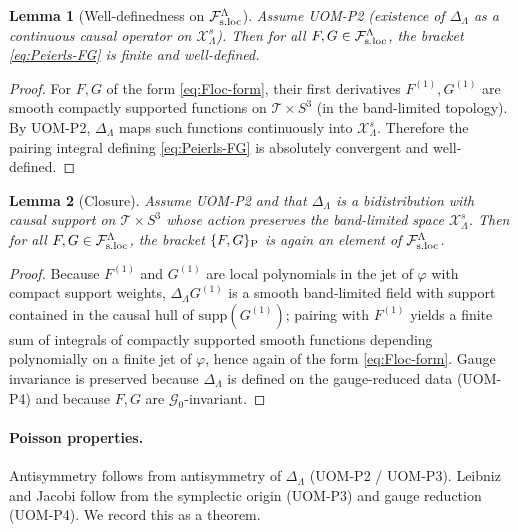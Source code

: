 \documentclass[10pt]{article}
\theoremstyle{definition}
\theoremstyle{plain}
\newtheorem{lemma}{Lemma}[section]
\begin{document}
\begin{lemma}[Well-definedness on $\mathcal F_{\rm s.loc}^\Lambda$]
\label{lem:Peierls-well-defined}
Assume UOM-P2 (existence of $\Delta_\Lambda$ as a continuous causal operator on $\mathcal X_\Lambda^s$).
Then for all $F,G\in\mathcal F_{\rm s.loc}^\Lambda$, the bracket \eqref{eq:Peierls-FG} is finite and well-defined.
\end{lemma}

\begin{proof}
For $F,G$ of the form \eqref{eq:Floc-form}, their first derivatives $F^{(1)},G^{(1)}$ are smooth compactly supported functions on
$\mathscr T\times S^3$ (in the band-limited topology).  By UOM-P2, $\Delta_\Lambda$ maps such functions continuously into $\mathcal X_\Lambda^s$.
Therefore the pairing integral defining \eqref{eq:Peierls-FG} is absolutely convergent and well-defined.
\end{proof}

\begin{lemma}[Closure]
\label{lem:closure}
Assume UOM-P2 and that $\Delta_\Lambda$ is a bidistribution with causal support on $\mathscr T\times S^3$ whose action preserves the band-limited
space $\mathcal X_\Lambda^s$.  Then for all $F,G\in\mathcal F_{\rm s.loc}^\Lambda$, the bracket $\{F,G\}_{\rm P}$ is again an element of
$\mathcal F_{\rm s.loc}^\Lambda$.
\end{lemma}

\begin{proof}
Because $F^{(1)}$ and $G^{(1)}$ are local polynomials in the jet of $\varphi$ with compact support weights, $\Delta_\Lambda G^{(1)}$ is a smooth
band-limited field with support contained in the causal hull of $\mathrm{supp}(G^{(1)})$; pairing with $F^{(1)}$ yields a finite sum of integrals
of compactly supported smooth functions depending polynomially on a finite jet of $\varphi$, hence again of the form \eqref{eq:Floc-form}.
Gauge invariance is preserved because $\Delta_\Lambda$ is defined on the gauge-reduced data (UOM-P4) and because $F,G$ are $\mathcal G_0$-invariant.
\end{proof}

\paragraph{Poisson properties.}
Antisymmetry follows from antisymmetry of $\Delta_\Lambda$ (UOM-P2 / UOM-P3).  Leibniz and Jacobi follow from the symplectic origin
(UOM-P3) and gauge reduction (UOM-P4).  We record this as a theorem.
\end{document}
